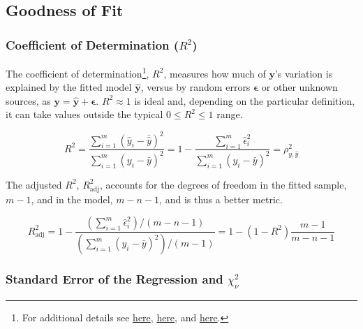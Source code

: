 \subsection{Goodness of Fit}
\label{regression:linear:goodness_of_fit}

\subsubsection{Coefficient of Determination ($R^{2}$)}
\label{regression:linear:goodness_of_fit:R2}

The coefficient of determination\footnote{For additional details see
\href{https://economictheoryblog.com/2014/11/05/the-coefficient-of-determination-latex-r2/}{here},
\href{https://economictheoryblog.com/2014/11/05/proof/}{here}, and
\href{http://people.duke.edu/~rnau/rsquared.htm}{here}.}, $R^{2}$,
measures how much of $\mathbf{y}$'s variation is explained by the fitted model $\hat{\mathbf{y}}$,
versus by random errors $\mathbf{\epsilon}$ or other unknown sources,
as $\mathbf{y} = \hat{\mathbf{y}} + \mathbf{\epsilon}$.
$R^{2} \approx 1$ is ideal and, depending on the particular definition,
it can take values outside the typical $0 \leq R^{2} \leq 1$ range.

\begin{equation}\label{eq:regression:linear:goodness_of_fit:R2}
R^{2} = \frac{
\sum_{i=1}^{m} \left(\hat{y}_{i} - \bar{\hat{y}}\right)^{2}
}{
\sum_{i=1}^{m} \left(y_{i} - \bar{y}\right)^{2}
} = 1 - \frac{
\sum_{i=1}^{m} \hat{\epsilon}_{i}^{2}
}{
\sum_{i=1}^{m} \left(y_{i} - \bar{y}\right)^{2}
} = \rho_{y,\hat{y}}^{2}
\end{equation}

The adjusted $R^{2}$, $R^{2}_{\text{adj}}$, accounts for the degrees of freedom in the
fitted sample, $m-1$, and in the model, $m-n-1$, and is thus a better metric.

\begin{equation}\label{eq:regression:linear:goodness_of_fit:R2_adj}
R^{2}_{\text{adj}} = 1 - \frac{
\left(\sum_{i=1}^{m} \hat{\epsilon}_{i}^{2}\right)/\left(m-n-1\right)
}{
\left(\sum_{i=1}^{m} \left(y_{i} - \bar{y}\right)^{2}\right)/\left(m-1\right)
}
= 1 - \left(1-R^{2}\right)\frac{m-1}{m-n-1}
\end{equation}

\subsubsection{Standard Error of the Regression and $\chi_{\nu}^{2}$}
\label{regression:linear:goodness_of_fit:reduced_chi2}


